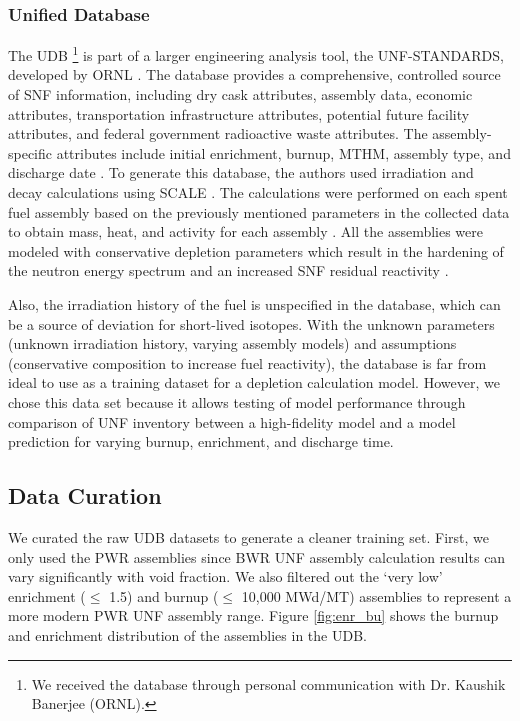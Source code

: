 \subsubsection{Unified Database}
\label{unf}
The \gls{UDB} \footnote{We received the database through personal communication with
Dr. Kaushik Banerjee (ORNL).} is part of a larger engineering
analysis tool, the \gls{UNF-STANDARDS}, developed
by \gls{ORNL} \cite{peterson_used_2013}.  
The database provides a comprehensive, controlled
source of \gls{SNF} information, including
dry cask attributes, assembly data, economic attributes,
transportation infrastructure attributes, potential future
facility attributes, and federal government radioactive
waste attributes. 
The assembly-specific attributes include
initial enrichment, burnup, \gls{MTHM}, assembly 
type, and discharge date \cite{peterson_fuel_2015}. 
To generate this database, the authors used
irradiation and decay calculations using SCALE 
\cite{bowman_scale_2011}. The calculations were performed on each 
spent fuel assembly based on the previously mentioned 
parameters in the collected data to obtain mass, heat, 
and activity for each assembly \cite{peterson_additional_2017}. 
All the assemblies were modeled with conservative 
depletion parameters which result in the hardening of 
the neutron energy spectrum and an increased \gls{SNF} 
residual reactivity \cite{peterson_additional_2017}. 

Also, the irradiation history of the fuel is unspecified in the
database, which can be a source of deviation for short-lived isotopes.
With the unknown parameters (unknown irradiation history, varying
assembly models) and assumptions (conservative composition to
increase fuel reactivity), the database is far from ideal to use
as a training dataset for a depletion calculation model. However,
we chose this data set because it allows testing of model performance
through comparison of \gls{UNF}
inventory between a high-fidelity model and a model prediction for
varying burnup, enrichment, and discharge time.


\subsection{Data Curation}

We curated the raw \gls{UDB} datasets to generate
a cleaner training set. First, we only used the 
\gls{PWR} assemblies since \gls{BWR} \gls{UNF} assembly
calculation results can vary significantly with void fraction.
We also filtered out the
`very low' enrichment ($\leq$ 1.5) and
burnup ($\leq$ 10,000 MWd/MT)
assemblies to represent a more modern \gls{PWR} \gls{UNF}
assembly range. Figure \ref{fig:enr_bu} shows the
burnup and enrichment distribution of the assemblies in the
\gls{UDB}.


